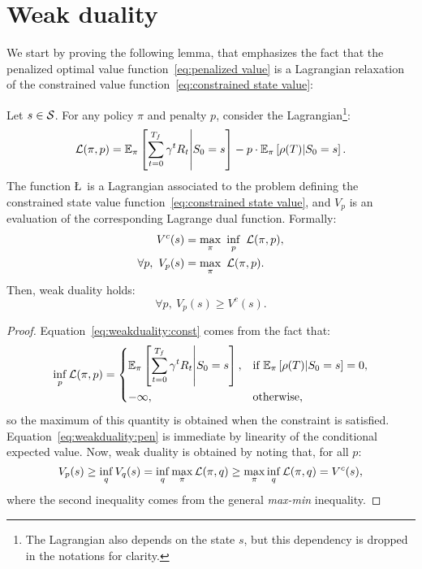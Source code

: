 \section{Weak duality}
We start by proving the following lemma, that emphasizes the fact that the penalized optimal value function~\eqref{eq:penalized value} is a Lagrangian relaxation of the constrained value function~\eqref{eq:constrained state value}:
\begin{lemma} \label{lemma:weak duality}
	Let $s\in\S$. For any policy $\pi$ and penalty $p$, consider the Lagrangian\footnote{The Lagrangian also depends on the state $s$, but this dependency is dropped in the notations for clarity.}:
	\begin{equation}
	\L(\pi, p) = \condexpected{\pi}{\sum_{t=0}^\Tf\gamma^tR_t}{S_0 = s} - p\cdot \condexpected{\pi}{\rho(T)}{S_0 = s}.
	\label{eq:lagrangian}
	\end{equation}
	The function \L~is a Lagrangian associated to the problem defining the constrained state value function~\eqref{eq:constrained state value}, and $V_p$ is an evaluation of the corresponding Lagrange dual function. Formally:
	\begin{align}
	V^c(s) & = \max_\pi~\inf_p~\L(\pi, p), \label{eq:weakduality:const}\\
	\forall p,~V_p(s) & = \max_\pi~\L(\pi, p). \label{eq:weakduality:pen}
	\end{align}
	Then, weak duality holds:
	\begin{equation}
	\forall p,~V_p(s) \geq V^c(s).
	\label{eq:weakduality}
	\end{equation}
	\label{lemma:weakduality}
\end{lemma}
\begin{proof}
	Equation~\eqref{eq:weakduality:const} comes from the fact that: $$\inf_p \L(\pi, p) = \begin{dcases}
	\condexpected{\pi}{\sum_{t=0}^\Tf\gamma^tR_t}{S_0 = s},& \text{if } \condexpected{\pi}{\rho(T)}{S_0 = s} = 0,\\
	-\infty, & \text{otherwise,}
	\end{dcases}
	$$
	so the maximum of this quantity is obtained when the constraint is satisfied. Equation~\eqref{eq:weakduality:pen} is immediate by linearity of the conditional expected value. Now, weak duality is obtained by noting that, for all $p$:
	$$
	V_p(s) \geq \inf_q V_q(s) = \inf_q \max_\pi \L(\pi, q) \geq \max_\pi \inf_q \L(\pi, q) = V^c(s),
	$$
	where the second inequality comes from the general \emph{max-min} inequality.
\end{proof}

